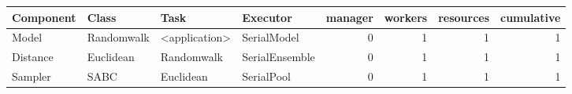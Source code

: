 \begin{tabular}{|l|l|l|l|r|r|r|r|}
\hline
Component & Class & Task & Executor & manager & workers & resources & cumulative\\
\hline
\hline
Model & Randomwalk & \textless{}application\textgreater{} & SerialModel & 0 & 1 & 1 & 1\\
\hline
Distance & Euclidean & Randomwalk & SerialEnsemble & 0 & 1 & 1 & 1\\
\hline
Sampler & SABC & Euclidean & SerialPool & 0 & 1 & 1 & 1\\
\hline
\end{tabular}